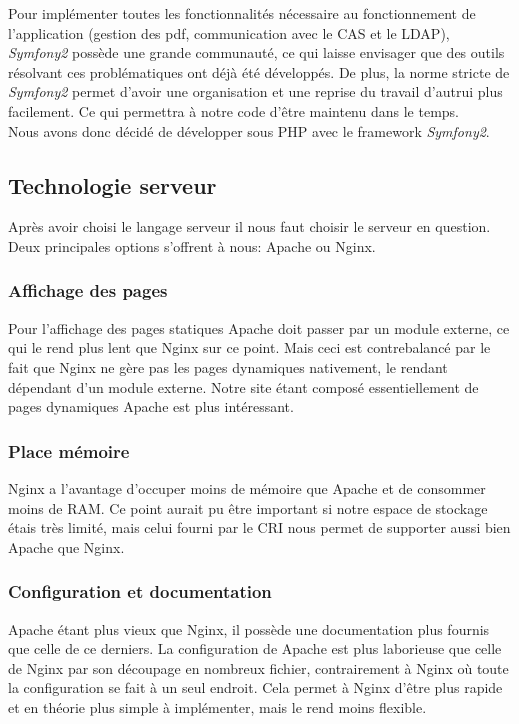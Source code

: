 Pour implémenter toutes les fonctionnalités nécessaire au fonctionnement de l'application (gestion des pdf, communication avec le CAS et le LDAP), \textit{Symfony2} possède une grande communauté, ce qui laisse envisager que des outils résolvant ces problématiques ont déjà été développés.
De plus, la norme stricte de \textit{Symfony2} permet d'avoir une organisation et une reprise du travail d'autrui plus facilement. Ce qui permettra à notre code d'être maintenu dans le temps.\\

Nous avons donc décidé de développer sous PHP avec le framework \textit{Symfony2}.

\subsection{Technologie serveur}

Après avoir choisi le langage serveur il nous faut choisir le serveur en question. Deux principales options s'offrent à nous: Apache ou Nginx.

\subsubsection{Affichage des pages}
Pour l'affichage des pages statiques Apache doit passer par un module externe, ce qui le rend plus lent que Nginx sur ce point.
Mais ceci est contrebalancé par le fait que Nginx ne gère pas les pages dynamiques nativement, le rendant dépendant d'un module externe.
Notre site étant composé essentiellement de pages dynamiques Apache est plus intéressant.

\subsubsection{Place mémoire}
Nginx a l'avantage d'occuper moins de mémoire que Apache et de consommer moins de RAM.
Ce point aurait pu être important si notre espace de stockage étais très limité, mais celui fourni par le CRI nous permet de supporter aussi bien Apache que Nginx.

\subsubsection{Configuration et documentation}
Apache étant plus vieux que Nginx, il possède une documentation plus fournis que celle de ce derniers.
La configuration de Apache est plus laborieuse que celle de Nginx par son découpage en nombreux fichier, contrairement à Nginx où toute la configuration se fait à un seul endroit.
Cela permet à Nginx d'être plus rapide et en théorie plus simple à implémenter, mais le rend moins flexible.

